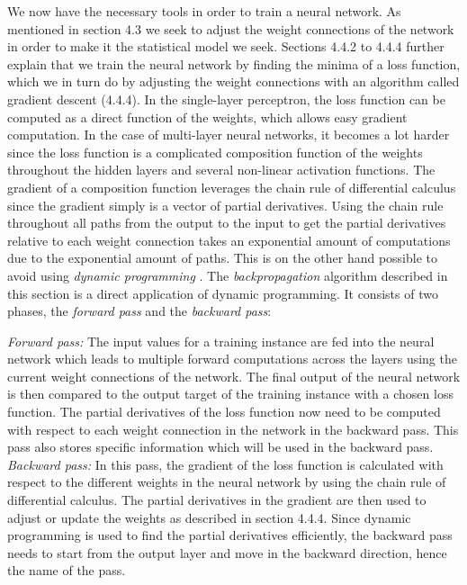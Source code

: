\documentclass[titlepage]{article}
\begin{document}
We now have the necessary tools in order to train a neural network. As mentioned in section 4.3 we seek to adjust the weight connections of the network in order to make it the statistical model we seek. Sections 4.4.2 to 4.4.4 further explain that we train the neural network by finding the minima of a loss function, which we in turn do by adjusting the weight connections with an algorithm called gradient descent (4.4.4). In the single-layer perceptron, the loss function can be computed as a direct function of the weights, which allows easy gradient computation. In the case of multi-layer neural networks, it becomes a lot harder since the loss function is a complicated composition function of the weights throughout the hidden layers and several non-linear activation functions. The gradient of a composition function leverages the chain rule of differential calculus since the gradient simply is a vector of partial derivatives. Using the chain rule throughout all paths from the output to the input to get the partial derivatives relative to each weight connection takes an exponential amount of computations due to the exponential amount of paths. This is on the other hand possible to avoid using \emph{dynamic programming} \cite{charu}. The \emph{backpropagation} algorithm \cite{charu} described in this section is a direct application of dynamic programming. It consists of two phases, the \emph{forward pass} and the \emph{backward pass}:

\begin{outline}
    \1 \emph{Forward pass:} The input values for a training instance are fed into the neural network which leads to multiple forward computations across the layers using the current weight connections of the network. The final output of the neural network is then compared to the output target of the training instance with a chosen loss function. The partial derivatives of the loss function now need to be computed with respect to each weight connection in the network in the backward pass. This pass also stores specific information which will be used in the backward pass.
    \1 \emph{Backward pass:} In this pass, the gradient of the loss function is calculated with respect to the different weights in the neural network by using the chain rule of differential calculus. The partial derivatives in the gradient are then used to adjust or update the weights as described in section 4.4.4. Since dynamic programming is used to find the partial derivatives efficiently, the backward pass needs to start from the output layer and move in the backward direction, hence the name of the pass.
\end{outline}
\end{document}
